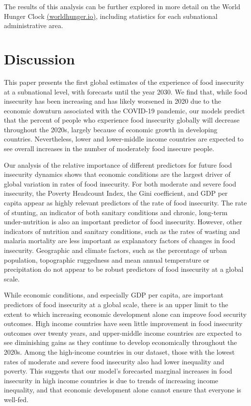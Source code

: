 \documentclass{article}
\begin{document}
The results of this analysis can be further explored in more detail on the World Hunger Clock \href{https://worldhunger.io}{(worldhunger.io)}, including statistics for each subnational administrative area.

\section{Discussion}
This paper presents the first global estimates of the experience of food insecurity at a subnational level, with forecasts until the year 2030.  We find that, while food insecurity has been increasing and has likely worsened in 2020 due to the economic downturn associated with the COVID-19 pandemic, our models predict that the percent of people who experience food insecurity globally will decrease throughout the 2020s, largely because of economic growth in developing countries.  Nevertheless, lower and lower-middle income countries are expected to see overall increases in the number of moderately food insecure people. 

Our analysis of the relative importance of different predictors for future food insecurity dynamics shows that economic conditions are the largest driver of global variation in rates of food insecurity. For both moderate and severe food insecurity, the Poverty Headcount Index, the Gini coefficient, and GDP per capita appear as highly relevant predictors of the rate of food insecurity. The rate of stunting, an indicator of both sanitary conditions and chronic, long-term under-nutrition is also an important predictor of food insecurity. However, other indicators of nutrition and sanitary conditions, such as the rates of wasting and malaria mortality are less important as explanatory factors of changes in food insecurity. Geographic and climate factors, such as the percentage of urban population, topographic ruggedness and mean annual temperature or precipitation do not appear to be robust predictors of food insecurity at a global scale. 

While economic conditions, and especially GDP per capita, are important predictors of food insecurity at a global scale, there is an upper limit to the extent to which increasing economic development alone can improve food security outcomes.  High income countries have seen little improvement in food insecurity outcomes over twenty years, and upper-middle income countries are expected to see diminishing gains as they continue to develop economically throughout the 2020s.  Among the high-income countries in our dataset, those with the lowest rates of moderate and severe food insecurity also had lower inequality and poverty.  This suggests that our model's forecasted marginal increases in food insecurity in high income countries is due to trends of increasing income inequality, and that economic development alone cannot ensure that everyone is well-fed.
\end{document}

